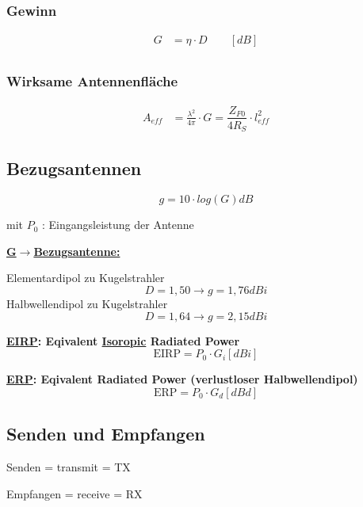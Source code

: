 \subsubsection{Gewinn}
\begin{align*}
    G & = \eta \cdot D \qquad [\si{dB}] \\
\end{align*}

\subsubsection{Wirksame Antennenfläche}
\begin{align*}
    A_{eff} & = \frac{\lambda^2}{4\pi}\cdot G = \dfrac{Z_{F0}}{4 R_S} \cdot l_{eff}^2
\end{align*}

\subsection{Bezugsantennen}
\[
    \boxed{g = 10 \cdot log(G) \si{dB}}
\]

mit $P_0$ : Eingangsleistung der Antenne

\begin{description}
    \item \textbf{\underline{G$\rightarrow$Bezugsantenne:}}

          Elementardipol  zu Kugelstrahler \[D = 1,50 \rightarrow g = 1,76\si{dBi}\]
          Halbwellendipol zu Kugelstrahler \[D = 1,64 \rightarrow g = 2,15\si{dBi}\]

    \item \textbf{\underline{EIRP}: Eqivalent \underline{Isoropic} Radiated Power}
          \[
              \text{EIRP} = P_0 \cdot G_i [\si{dBi}]
          \]

    \item \textbf{\underline{ERP}: Eqivalent Radiated Power (verlustloser Halbwellendipol)}
          \[
              \text{ERP} = P_0 \cdot G_d [\si{dBd}]
          \]
\end{description}

\subsection{Senden und Empfangen}


\begin{description}
    \item Senden = transmit = TX
    \item Empfangen = receive = RX
\end{description}

